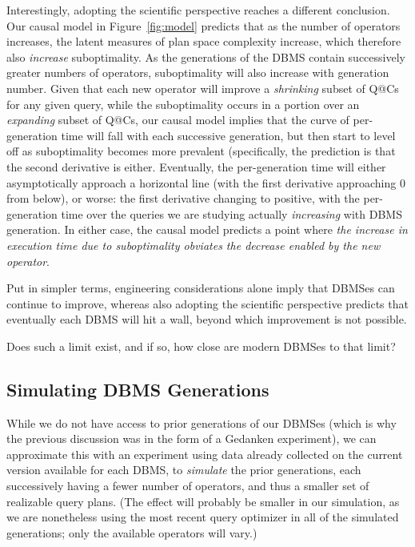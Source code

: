 \documentclass[prodmode,acmtods]{acmsmall}
\begin{document}
Interestingly, adopting the scientific perspective reaches a different conclusion. Our
causal model in Figure~\ref{fig:model} predicts that as the number of
operators increases, the latent measures of plan space complexity increase,
which therefore also {\em increase} suboptimality. As the generations of the
\hbox{DBMS} contain successively greater numbers of operators, suboptimality
will also increase with generation number.  Given that each new operator
will improve a {\em shrinking}
subset of Q@Cs for any given query, while the suboptimality occurs in a portion over an
{\em expanding} subset of Q@Cs, our causal model implies that the curve of
per-generation time will fall with each successive generation, but then
start to level off as suboptimality becomes more prevalent (specifically,
the prediction is that the second derivative is either. Eventually, the
per-generation time will either asymptotically approach a horizontal line
(with the first derivative approaching 0 from below), or worse: the first
derivative changing to positive, with the per-generation time over the
queries we are studying actually {\em increasing} with \hbox{DBMS}
generation. In either case, the causal model predicts a point where {\em the
\hbox{increase} in execution time due to suboptimality obviates the decrease
enabled by the new operator}.

Put in simpler terms, engineering considerations alone imply that DBMSes can
continue to improve, whereas also adopting the scientific perspective predicts
that eventually each DBMS will hit a wall, beyond which improvement is not possible.

Does such a limit exist, and if so, how close are modern \hbox{DBMSes} to that limit?

\subsection{Simulating \hbox{DBMS} Generations}
While we do not have access to prior generations of our \hbox{DBMSes} (which is why
the previous discussion was in the form of a Gedanken experiment), we can
approximate this with an experiment using data already collected on the
current version available for each \hbox{DBMS}, to {\em simulate} the prior
generations, each successively having a fewer number of operators, and thus a smaller set of
realizable query plans. (The effect will probably be smaller in our
simulation, as we are nonetheless using the most recent query
optimizer in all of the simulated generations; only the available operators
will vary.)
\end{document}
